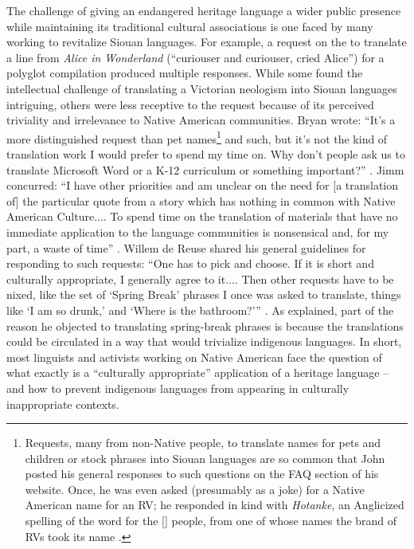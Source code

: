 \documentclass[output=paper]{LSP/langsci}
\begin{document}
The challenge of giving an endangered heritage language a wider public presence while maintaining its traditional cultural associations is one faced by many working to revitalize Siouan languages. For example, a request on the  to translate a line from \emph{Alice in Wonderland} (``curiouser and curiouser, cried Alice'') for a polyglot compilation produced multiple responses. While some found the intellectual challenge of translating a Victorian neologism into Siouan languages intriguing, others were less receptive to the request because of its perceived triviality and irrelevance to Native American communities. Bryan wrote: ``It's a more distinguished request than pet names\footnote{Requests, many from non-Native people, to translate names for pets and children or stock  phrases into Siouan languages are so common that John \citet{Koontz2003a} posted his general responses to such questions on the FAQ section of his website. Once, he was even asked (presumably as a joke) for a Native American name for an RV; he responded in kind with \emph{Hotanke}, an Anglicized spelling of the  word for the  [] people, from one of whose  names the  brand of RVs took its name \citep{Koontz2003b}.} and such, but it's not the kind of translation work I would prefer to spend my time on. Why don't people ask us to translate Microsoft Word or a K-12 curriculum or something important?'' \citep{Gordon2014}. Jimm concurred: ``I have other priorities and am unclear on the need for [a translation of] the particular quote from a story which has nothing in common with Native American Culture.... To spend time on the translation of materials that have no immediate application to the language communities is nonsensical and, for my part, a waste of time'' \citep{Goodtracks2014}. Willem de Reuse shared his general guidelines for responding to such requests: ``One has to pick and choose. If it is short and culturally appropriate, I generally agree to it.... Then other requests have to be nixed, like the set of `Spring Break' phrases I once was asked to translate, things like `I am so drunk,' and `Where is the bathroom?'\thinspace'' \citep{deReuse2014a}. As \citet{deReuse2014b} explained, part of the reason he objected to translating spring-break phrases is because the translations could be circulated in a way that would trivialize indigenous languages. In short, most linguists and activists working on Native American  face the question of what exactly is a ``culturally appropriate'' application of a heritage language -- and how to prevent indigenous languages from appearing in culturally inappropriate contexts.
\end{document}
